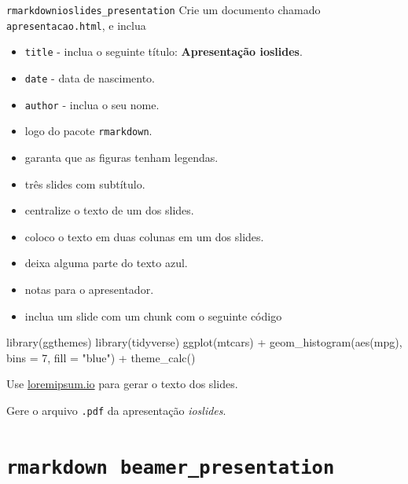 \documentclass[
  10pt,
  ignorenonframetext,
]{beamer}
\newenvironment{Shaded}{\begin{snugshade}}{\end{snugshade}}
\newcommand{\AttributeTok}[1]{\textcolor[rgb]{0.40,0.45,0.13}{#1}}
\newcommand{\DecValTok}[1]{\textcolor[rgb]{0.68,0.00,0.00}{#1}}
\newcommand{\FunctionTok}[1]{\textcolor[rgb]{0.28,0.35,0.67}{#1}}
\newcommand{\NormalTok}[1]{\textcolor[rgb]{0.00,0.23,0.31}{#1}}
\newcommand{\SpecialCharTok}[1]{\textcolor[rgb]{0.37,0.37,0.37}{#1}}
\newcommand{\StringTok}[1]{\textcolor[rgb]{0.13,0.47,0.30}{#1}}
\providecommand{\tightlist}{%
  \setlength{\itemsep}{0pt}\setlength{\parskip}{0pt}}\usepackage{longtable,booktabs,array}
\begin{document}
\begin{frame}[fragile]{\texttt{rmarkdown}\newline \texttt{ioslides\_presentation}}
\protect\hypertarget{rmarkdownioslides_presentation-13}{}
Crie um documento chamado \texttt{apresentacao.html}, e inclua

\begin{itemize}
\tightlist
\item
  \texttt{title} - inclua o seguinte título: \textbf{Apresentação
  ioslides}.
\item
  \texttt{date} - data de nascimento.
\item
  \texttt{author} - inclua o seu nome.
\item
  logo do pacote \texttt{rmarkdown}.
\item
  garanta que as figuras tenham legendas.
\item
  três slides com subtítulo.
\item
  centralize o texto de um dos slides.
\item
  coloco o texto em duas colunas em um dos slides.
\item
  deixa alguma parte do texto azul.
\item
  notas para o apresentador.
\item
  inclua um slide com um chunk com o seguinte código
\end{itemize}

\begin{Shaded}
\begin{Highlighting}[]
\FunctionTok{library}\NormalTok{(ggthemes)}
\FunctionTok{library}\NormalTok{(tidyverse)}
\FunctionTok{ggplot}\NormalTok{(mtcars) }\SpecialCharTok{+}
  \FunctionTok{geom\_histogram}\NormalTok{(}\FunctionTok{aes}\NormalTok{(mpg), }\AttributeTok{bins =} \DecValTok{7}\NormalTok{, }\AttributeTok{fill =} \StringTok{"blue"}\NormalTok{) }\SpecialCharTok{+}
  \FunctionTok{theme\_calc}\NormalTok{()}
\end{Highlighting}
\end{Shaded}
\end{frame}

\begin{frame}[fragile]
Use \href{https://loremipsum.io/}{loremipsum.io} para gerar o texto dos
slides.

Gere o arquivo \texttt{.pdf} da apresentação \emph{ioslides}.
\end{frame}

\hypertarget{rmarkdown-beamer_presentation}{%
\section{\texorpdfstring{\texttt{rmarkdown}\newline\newline~\texttt{beamer\_presentation}}{rmarkdown~beamer\_presentation}}\label{rmarkdown-beamer_presentation}}
\end{document}

